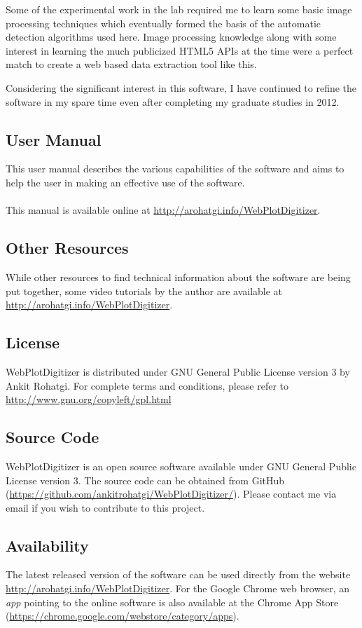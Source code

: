 \documentclass[letterpaper, 10pt]{article}
\begin{document}
Some of the experimental work in the lab required me to learn some basic image processing techniques which eventually formed the basis of the automatic detection algorithms used here. Image processing knowledge along with some interest in learning the much publicized HTML5 APIs at the time were a perfect match to create a web based data extraction tool like this.

Considering the significant interest in this software, I have continued to refine the software in my spare time even after completing my graduate studies in 2012.
\subsection{User Manual}
This user manual describes the various capabilities of the software and aims to help the user in making an effective use of the software. 
\\
\\
This manual is available online at \url{http://arohatgi.info/WebPlotDigitizer}.

\subsection{Other Resources}
While other resources to find technical information about the software are being put together, some video tutorials by the author are available at \url{http://arohatgi.info/WebPlotDigitizer}.

\subsection{License}
WebPlotDigitizer is distributed under GNU General Public License version 3 by Ankit Rohatgi. For complete terms and conditions, please refer to \url{http://www.gnu.org/copyleft/gpl.html}
\subsection{Source Code}
WebPlotDigitizer is an open source software available under GNU General Public License version 3. The source code can be obtained from GitHub (\url{https://github.com/ankitrohatgi/WebPlotDigitizer/}). Please contact me via email if you wish to contribute to this project.

\subsection{Availability}
The latest released version of the software can be used directly from the website \url{http://arohatgi.info/WebPlotDigitizer}. For the Google Chrome web browser, an \emph{app} pointing to the online software is also available at the Chrome App Store (\url{https://chrome.google.com/webstore/category/apps}).
\end{document}
